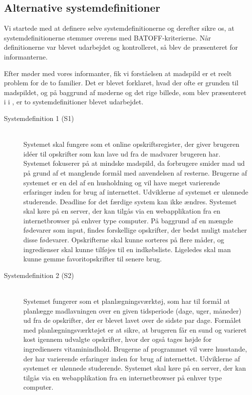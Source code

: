 \subsection{Alternative systemdefinitioner}
\label{subsec:alternativesystemdefinitioner}

Vi startede med at definere selve systemdefinitionerne og derefter sikre os, at systemdefinitionerne stemmer overens med BATOFF-kriterierne. Når definitionerne var blevet udarbejdet og kontrolleret, så blev de præsenteret for informanterne.

Efter møder med vores informanter, fik vi forståelsen at madspild er et reelt problem for de to familier. Det er blevet forklaret, hvad der ofte er grunden til madspildet, og på baggrund af møderne og det rige billede, som blev præsenteret i  i , er to systemdefinitioner blevet udarbejdet.

\begin{description}
\item[Systemdefinition 1 (S1)] \hfill \\
Systemet skal fungere som et online opskriftsregister, der giver brugeren idéer til opskrifter som kan lave ud fra de madvarer brugeren har. Systemet fokuserer på at mindske madspild, da forbrugere smider mad ud på grund af et manglende formål med anvendelsen af resterne. Brugerne af systemet er en del af en husholdning og vil have meget varierende erfaringer inden for brug af internettet. Udviklerne af systemet er ulønnede studerende. Deadline for det færdige system kan ikke ændres. Systemet skal køre på en server, der kan tilgås via en webapplikation fra en internetbrowser på enhver type computer. På baggrund af en mængde fødevarer som input, findes forskellige opskrifter, der bedst muligt matcher disse fødevarer. Opskrifterne skal kunne sorteres på flere måder, og ingredienser skal kunne tilføjes til en indkøbsliste. Ligeledes skal man kunne gemme favoritopskrifter til senere brug.
\item[Systemdefinition 2 (S2)] \hfill \\
Systemet fungerer som et planlægningsværktøj, som har til formål at planlægge madlavningen over en given tidsperiode (\fx dage, uger, måneder) ud fra de opskrifter, der er blevet lavet over de sidste par dage. Formålet med planlægningsværktøjet er at sikre, at brugeren får en sund og varieret kost igennem udvalgte opskrifter, hvor der også tages højde for ingrediensers vitaminindhold. Brugerne af programmet vil være husstande, der har varierende erfaringer inden for brug af internettet. Udviklerne af systemet er ulønnede studerende. Systemet skal køre på en server, der kan tilgås via en webapplikation fra en internetbrowser på enhver type computer.
\end{description}

